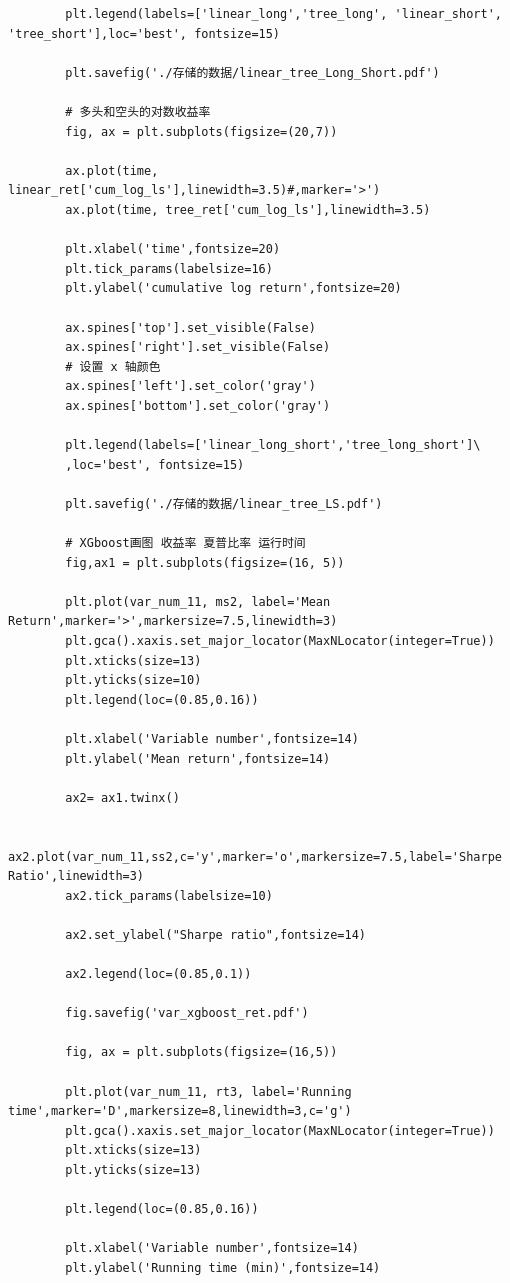 \documentclass[12pt]{article} %
\begin{document}
\begin{lstlisting}
		plt.legend(labels=['linear_long','tree_long', 'linear_short', 'tree_short'],loc='best', fontsize=15)
				
		plt.savefig('./存储的数据/linear_tree_Long_Short.pdf')
		
		# 多头和空头的对数收益率
		fig, ax = plt.subplots(figsize=(20,7))
		
		ax.plot(time, linear_ret['cum_log_ls'],linewidth=3.5)#,marker='>')
		ax.plot(time, tree_ret['cum_log_ls'],linewidth=3.5)
		
		plt.xlabel('time',fontsize=20)
		plt.tick_params(labelsize=16)
		plt.ylabel('cumulative log return',fontsize=20)
		
		ax.spines['top'].set_visible(False) 
		ax.spines['right'].set_visible(False)
		# 设置 x 轴颜色
		ax.spines['left'].set_color('gray')
		ax.spines['bottom'].set_color('gray')
		
		plt.legend(labels=['linear_long_short','tree_long_short']\
		,loc='best', fontsize=15)
		
		plt.savefig('./存储的数据/linear_tree_LS.pdf')
		
		# XGboost画图 收益率 夏普比率 运行时间
		fig,ax1 = plt.subplots(figsize=(16, 5))
		
		plt.plot(var_num_11, ms2, label='Mean Return',marker='>',markersize=7.5,linewidth=3)
		plt.gca().xaxis.set_major_locator(MaxNLocator(integer=True))
		plt.xticks(size=13)
		plt.yticks(size=10)
		plt.legend(loc=(0.85,0.16))
		
		plt.xlabel('Variable number',fontsize=14) 
		plt.ylabel('Mean return',fontsize=14)
		
		ax2= ax1.twinx()
		
		ax2.plot(var_num_11,ss2,c='y',marker='o',markersize=7.5,label='Sharpe Ratio',linewidth=3)
		ax2.tick_params(labelsize=10)
		
		ax2.set_ylabel("Sharpe ratio",fontsize=14)
		
		ax2.legend(loc=(0.85,0.1))
		
		fig.savefig('var_xgboost_ret.pdf')
		
		fig, ax = plt.subplots(figsize=(16,5))
		
		plt.plot(var_num_11, rt3, label='Running time',marker='D',markersize=8,linewidth=3,c='g')
		plt.gca().xaxis.set_major_locator(MaxNLocator(integer=True))
		plt.xticks(size=13)
		plt.yticks(size=13)
		
		plt.legend(loc=(0.85,0.16))
		
		plt.xlabel('Variable number',fontsize=14) 
		plt.ylabel('Running time (min)',fontsize=14)
		

\end{lstlisting}
\end{document}
